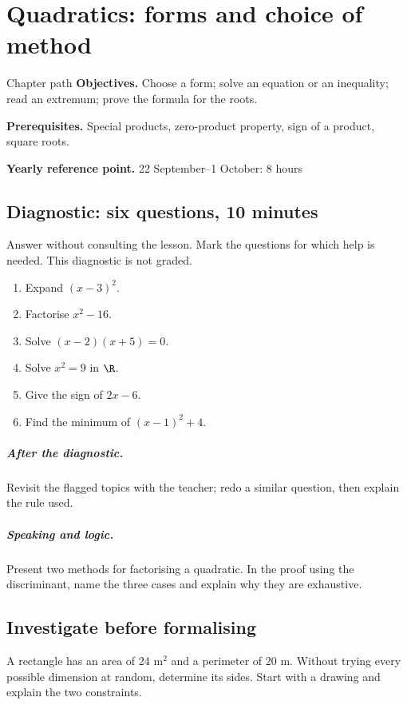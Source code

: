 \chapter{Quadratics: forms and choice of method}\label{C02}
\begin{repere}{Chapter path}
\textbf{Objectives.} Choose a form; solve an equation or an inequality; read an extremum; prove the formula for the roots.

\textbf{Prerequisites.} Special products, zero-product property, sign of a product, square roots.

\textbf{Yearly reference point.} 22 September--1 October: 8 hours\end{repere}
\section*{Diagnostic: six questions, 10 minutes}\label{C02-D}
Answer without consulting the lesson. Mark the questions for which help is needed. This diagnostic is not graded.
\begin{enumerate}
\item Expand $(x-3)^2$.
\item Factorise $x^2-16$.
\item Solve $(x-2)(x+5)=0$.
\item Solve $x^2=9$ in $\R$.
\item Give the sign of $2x-6$.
\item Find the minimum of $(x-1)^2+4$.
\end{enumerate}
\paragraph{After the diagnostic.} Revisit the flagged topics with the teacher; redo a similar question, then explain the rule used.
\paragraph{Speaking and logic.} Present two methods for factorising a quadratic. In the proof using the discriminant, name the three cases and explain why they are exhaustive.
\clearpage
\section*{Investigate before formalising}\label{C02-RECH}
A rectangle has an area of 24 m$^2$ and a perimeter of 20 m. Without trying every possible dimension at random, determine its sides. Start with a drawing and explain the two constraints.
